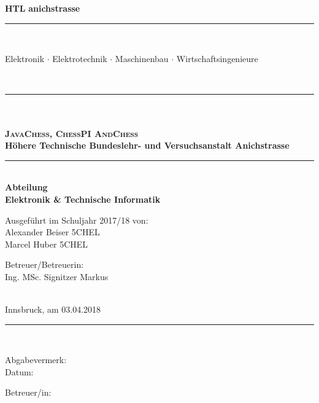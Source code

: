 \documentclass[12pt,a4paper]{article}
\begin{document}
\newcommand{\HtlHeader}[0]{%
	\hspace*{-11mm}%
	\raisebox{-1mm}{\logoB{0.12}}%
	\hspace*{2mm}%
	\parbox[b]{110mm}{\flushleft
		{\fontsize{20pt}{20pt}\selectfont\bf HTL}
		{\fontsize{16.2pt}{16.2pt}\selectfont\color{teal}\bf anichstrasse}
		\\[-4.05mm]{\color{darkgray}\rule{110mm}{0.5pt}}
		\\[-2.24mm]{\fontsize{7pt}{7pt}\selectfont\color{darkgray}
			Elektronik $\cdot$ Elektrotechnik $\cdot$
			Maschinenbau $\cdot$ Wirtschaftsingenieure
			\rule{0pt}{0mm}
		}
	}%
	\hspace*{5mm}%
	\\[-1.5mm]\rule{\textwidth}{0.5pt}
}%







\begin{titlepage}
 \begin{center}
   \begin{minipage}{\linewidth}
   \begin{center}
   \HtlHeader{}
	\vspace*{-10mm}
	{\fontsize{25pt}{25pt}\selectfont\bf \\[10mm]}
	\\[19mm]{\fontsize{20pt}{20pt}\selectfont\textbf{\textsc{JavaChess, ChessPI AndChess}}}
	\\[15mm]{\fontsize{12.4pt}{12.4pt}\selectfont\bf
		Höhere Technische Bundeslehr- und Versuchsanstalt Anichstrasse}
	\\[ 5mm]\rule{132mm}{1.0pt}
	\\[ 4mm]{\fontsize{12.4pt}{12.4pt}\selectfont\bf Abteilung}
	\\[ 5mm]{\fontsize{12.4pt}{12.4pt}\selectfont\bf Elektronik \& Technische Informatik}
	\\[24mm]{\hspace*{2mm}\parbox{154mm}{\fontsize{12.4pt}{12.4pt}\selectfont
	  \parbox[t]{75mm}{
		Ausgeführt im Schuljahr 2017/18 von:
		\\[5.0mm]Alexander Beiser 5CHEL
		\\[2.5mm]Marcel Huber 5CHEL 
	  }
	  \hspace*{6mm}
	  \parbox[t]{50mm}{
		Betreuer/Betreuerin:
		\\[5.0mm]Ing. MSc. Signitzer Markus
	  }
	  \\[14mm]{Innsbruck, am 03.04.2018}
	  \\[16mm]\rule{150mm}{0.5pt}
	  \\[ 8mm]
	  \parbox[t]{75mm}{
		Abgabevermerk:
		\\[3.25mm]Datum:
	  }
	  \hspace*{6mm}
	  \parbox[t]{50mm}{
		Betreuer/in:
	  }
	}}
   \end{center}\hfill
   \end{minipage}
 \end{center}
\end{titlepage}
\end{document}
